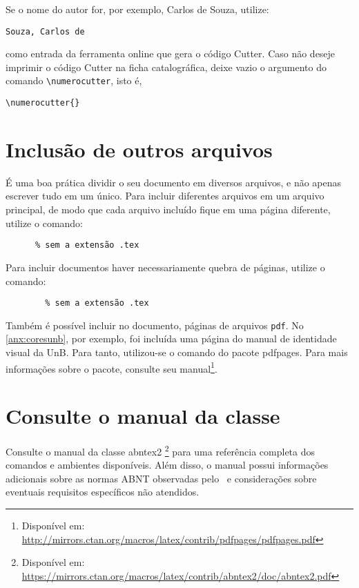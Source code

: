 Se o nome do autor for, por exemplo, Carlos de Souza, utilize: 
\begin{verbatim}
Souza, Carlos de
\end{verbatim}
como entrada da ferramenta online que gera o código Cutter. Caso não deseje imprimir o código Cutter na ficha catalográfica, deixe vazio o argumento do comando \verb|\numerocutter|, isto é,
\begin{verbatim}
\numerocutter{}
\end{verbatim}

\section{Inclusão de outros arquivos}\label{sec:include}

É uma boa prática dividir o seu documento em diversos arquivos, e não apenas escrever tudo em um único. Para incluir diferentes arquivos em um arquivo principal, de modo que cada arquivo incluído fique em uma página diferente, utilize o comando:
\begin{verbatim}
      % sem a extensão .tex
\end{verbatim}

Para incluir documentos haver necessariamente quebra de páginas, utilize o comando:
\begin{verbatim}
        % sem a extensão .tex
\end{verbatim}

Também é possível incluir no documento, páginas de arquivos \texttt{pdf}. No \cref{anx:coresunb}, por exemplo, foi incluída uma página do manual de identidade visual da UnB. Para tanto, utilizou-se o comando \verb|| do pacote \textsf{pdfpages}. Para mais informações sobre o pacote, consulte seu manual\footnote{Disponível em: \url{http://mirrors.ctan.org/macros/latex/contrib/pdfpages/pdfpages.pdf}}.

\section{Consulte o manual da classe \abnTeX}

Consulte o manual da classe \textsf{abntex2} \cite{abntex2classe}\footnote{Disponível em: \url{https://mirrors.ctan.org/macros/latex/contrib/abntex2/doc/abntex2.pdf}} para uma referência completa dos comandos e ambientes disponíveis. Além disso, o manual possui informações adicionais sobre as normas ABNT observadas pelo \abnTeX\ e considerações sobre eventuais requisitos específicos não atendidos.